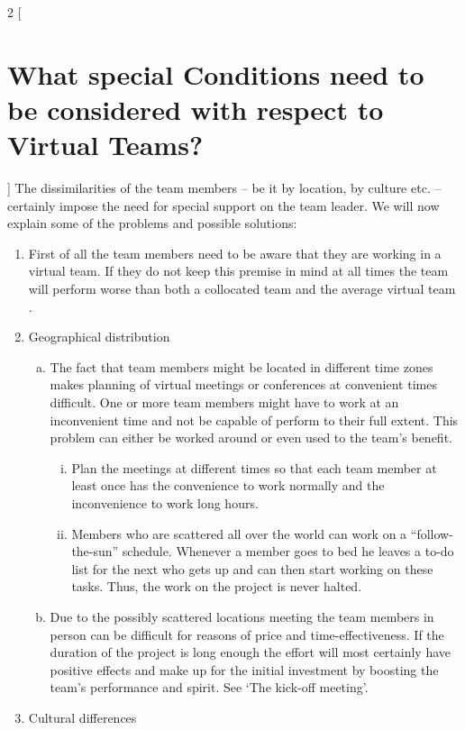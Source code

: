 \begin{multicols}{2}
[\section{What special Conditions need to be considered with respect to Virtual Teams?}]
The dissimilarities of the team members – be it by location, by culture etc. – certainly impose the need for special support on the team leader.
We will now explain some of the problems and possible solutions:
\begin{enumerate}[1.]
\item First of all the team members need to be aware that they are working in a virtual team. If they do not keep this premise in mind at all times the team will perform worse than both a collocated team and the average virtual team \cite{outperform}.
\item Geographical distribution
		\begin{enumerate}[a)]
		  \item The fact that team members might be located in different time zones makes planning of virtual meetings or conferences at convenient times difficult. One or more team members might have to work at an inconvenient time and not be capable of perform to their full extent. This problem can either be worked around or even used to the team’s benefit.
			\begin{enumerate}[i.]
			  	\item Plan the meetings at different times so that each team member at least once has the convenience to work normally and the inconvenience to work long hours.
				\item Members who are scattered all over the world can work on a “follow-the-sun” schedule. Whenever a member goes to bed he leaves a to-do list for the next who gets up and can then start working on these tasks. Thus, the work on the project is never halted.
			\end{enumerate}
		  \item Due to the possibly scattered locations meeting the team members in person can be difficult for reasons of price and time-effectiveness. If the duration of the project is long enough the effort will most certainly have positive effects and make up for the initial investment by boosting the team’s performance and spirit. See ‘The kick-off meeting’.
		\end{enumerate}
\item Cultural differences
		\begin{enumerate}[a)]

\end{enumerate}
\end{enumerate}
\end{multicols}
